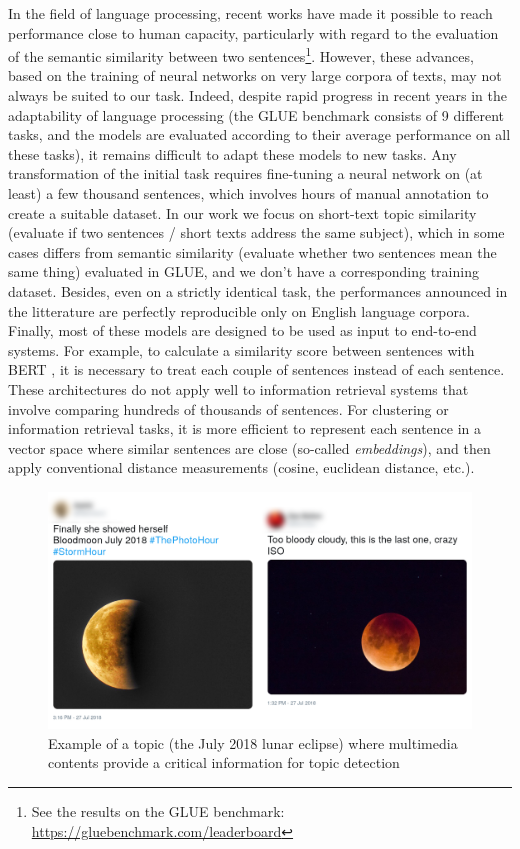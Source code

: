 In the field of language processing, recent works
have made it possible to reach performance close to human capacity, 
particularly with regard to the evaluation of the semantic similarity 
between two sentences\footnote{See the results on the GLUE benchmark: \url{https://gluebenchmark.com/leaderboard}}. However, these advances, 
based on the training of neural networks on very large corpora of texts,
may not always be suited to our task. Indeed, despite rapid progress 
in recent years in the adaptability of
language processing (the GLUE benchmark \cite{wang2018glue} consists of
9 different tasks, and the models are evaluated according to their average performance on
all these tasks), it remains difficult to adapt these models to new tasks. 
Any transformation of the initial task requires fine-tuning a neural network 
on (at least) a few thousand sentences, which
involves hours of manual annotation to create a suitable dataset. 
In our work we focus on short-text topic similarity (evaluate if two sentences / short texts
address the same subject), which in some cases differs from semantic similarity
(evaluate whether two sentences mean the same thing) evaluated in GLUE, and we don't 
have a corresponding training dataset. Besides, even on a strictly identical
task, the performances announced in the litterature are perfectly reproducible 
only on English language corpora. Finally, most of these models are designed to be used as input to
end-to-end systems. For example, to calculate a similarity score between sentences
with BERT \cite{devlin2018bert}, it is necessary to treat each couple of sentences instead of each sentence. 
These architectures do not apply well to information retrieval systems that involve comparing
hundreds of thousands of sentences. For clustering or information retrieval tasks, 
it is more efficient to represent each sentence in a vector space where similar sentences
 are close (so-called \textit{embeddings}), and then apply conventional distance measurements 
 (cosine, euclidean distance, etc.). 
 
 \begin{figure}
  \includegraphics[width=\textwidth]{figures/Moon_horizontal.png}
    \caption{Example of a topic (the July 2018 lunar eclipse) where multimedia contents provide a critical information for topic detection}
    \label{fig:moon}
\end{figure}
 
